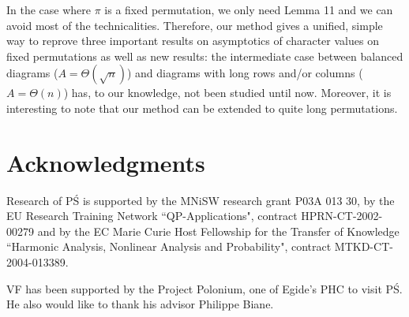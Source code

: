 \documentclass[12pt]{amsart}
\theoremstyle{plain}
\theoremstyle{remark}
\begin{document}
In the case where $\pi$ is a fixed permutation, we only need Lemma 11 and we
can avoid most of the technicalities. Therefore, our method gives a
unified, simple way to reprove three important results on asymptotics of
character values on fixed permutations as well as new results: the
intermediate case between balanced diagrams ($A=\Theta(\sqrt{n})$) and
diagrams with long rows and/or columns ($A=\Theta(n)$) has, to our
knowledge, not been studied until now. Moreover, it is interesting to note
that our method can be extended to quite long permutations.



\section*{Acknowledgments}

Research of P{\'S} is supported by the MNiSW research grant P03A 013 30, by the EU Research
Training Network ``QP-Applications", contract HPRN-CT-2002-00279 and  by the EC
Marie Curie Host Fellowship for the Transfer of Knowledge ``Harmonic Analysis,
Nonlinear Analysis and Probability", contract MTKD-CT-2004-013389.

VF has been supported by the Project Polonium, one of Egide's PHC to visit
P\'S. He also would like to thank his advisor Philippe Biane.




\end{document}
